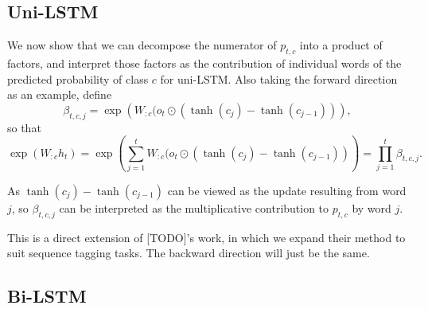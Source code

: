 \documentclass{article}
\begin{document}
\subsection{Uni-LSTM}

We now show that we can decompose the numerator of $p_{t, c}$ into a product of factors, and interpret those factors as the contribution of individual words of the predicted probability of class $c$ for uni-LSTM. Also taking the forward direction as an example, define 
\begin{equation}\label{eq:uni-beta} 
\beta_{t, c, j} = \exp\left(W_{:c} (o_t \odot (\tanh(c_j)- \tanh(c_{j-1}))\right),
\end{equation}
so that 
\[\exp( W_{:c} h_t) = \exp\left(\sum_{j=1}^t W_{:c} (o_t \odot (\tanh(c_j) - \tanh(c_{j-1}))\right) = \prod_{j=1}^t \beta_{t, c, j}.\]

As $\tanh(c_j) - \tanh(c_{j-1})$ can be viewed as the update resulting from word $j$, so $\beta_{t, c, j}$ can be interpreted as the multiplicative contribution to $p_{t, c}$ by word $j$. 

This is a direct extension of [TODO]'s work, in which we expand their method to suit sequence tagging tasks.
The backward direction will just be the same.

\subsection{Bi-LSTM}
\end{document}
